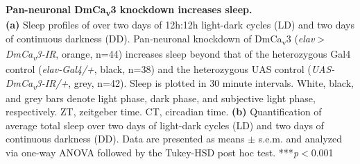 \label{fig:5}
\textbf{Pan-neuronal DmCa\textsubscript{v}3 knockdown increases sleep.}
\\
\textbf{(a)} Sleep profiles of over two days of 12h:12h light-dark cycles (LD) and two days of continuous darkness (DD). Pan-neuronal knockdown of DmCa\textsubscript{v}3 (\emph{elav$>$DmCa\textsubscript{v}3-IR}, orange, n=44) increases sleep beyond that of the heterozygous Gal4 control (\emph{elav-Gal4/+}, black, n=38) and the heterozygous UAS control (\emph{UAS-DmCa\textsubscript{v}3-IR/+}, grey, n=42).
Sleep is plotted in 30 minute intervals.
White, black, and grey bars denote light phase, dark phase, and subjective light phase, respectively.
ZT, zeitgeber time.
CT, circadian time.
\textbf{(b)} Quantification of average total sleep over two days of light-dark cycles (LD) and two days of continuous darkness (DD).
Data are presented as means $\pm$ s.e.m. and analyzed via one-way ANOVA followed by the Tukey-HSD post hoc test.
***\emph{p}$<$0.001

  